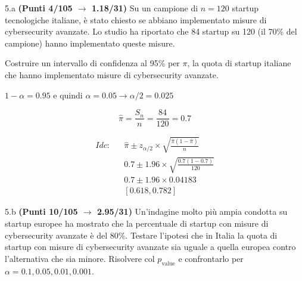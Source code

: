 \documentclass[
  11pt,
]{book}
\theoremstyle{mytheoremstyle}
\theoremstyle{mydefstyle}
\newenvironment{sol}
  {
  \begin{tcolorbox}[enhanced,breakable,arc=0.1mm,boxrule=1pt,colback=white,colframe=iblue,
  title=\bf \fontfamily{lmss}\selectfont \hspace{.5 cm} Soluzione,drop fuzzy shadow]

}{
\end{tcolorbox}
  }
\begin{document}
5.a \textbf{(Punti 4/105 \(\rightarrow\) 1.18/31)} Su un campione di \(n = 120\) startup tecnologiche italiane, è stato chiesto se abbiano implementato misure di cybersecurity avanzate. Lo studio ha riportato che 84 startup su 120 (il 70\% del campione) hanno implementato queste misure.

Costruire un intervallo di confidenza al 95\% per \(\pi\), la quota di startup italiane che hanno implementato misure di cybersecurity avanzate.

\begin{sol}
\(1-\alpha =0.95\) e quindi \(\alpha=0.05\rightarrow \alpha/2=0.025\)

\[
  \hat\pi = \frac{S_n}n = \frac{ 84 }{ 120 }= 0.7 
\]

\begin{eqnarray*}
  Idc: & &  \hat\pi \pm  z_{\alpha/2} \times \sqrt{\frac{\hat\pi(1-\hat\pi)}{n}} \\
     & &  0.7 \pm  1.96 \times \sqrt{\frac{ 0.7 (1- 0.7 )}{ 120 }} \\
     & &  0.7 \pm  1.96 \times  0.04183 \\
     & & [ 0.618 ,  0.782 ]
\end{eqnarray*}

\end{sol}

5.b \textbf{(Punti 10/105 \(\rightarrow\) 2.95/31)} Un'indagine molto più ampia condotta su startup europee ha mostrato che la percentuale di startup con misure di cybersecurity avanzate è del 80\%. Testare l'ipotesi che in Italia la quota di startup con misure di cybersecurity avanzate sia uguale a quella europea contro l'alternativa che sia minore. Risolvere col \(p_\text{value}\) e confrontarlo per \(\alpha=0.1,0.05,0.01,0.001\).
\end{document}
